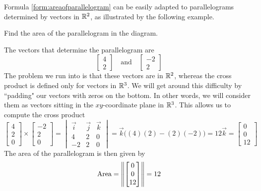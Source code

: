 \documentclass{ximera}
\begin{document}
Formula \ref{form:areaofparallelogram} can be easily adapted to parallelograms determined by vectors in $\mathbb{R}^2$, as illustrated by the following example.

\begin{example}\label{ex:areaofparallelogram}
Find the area of the parallelogram in the diagram.
\begin{center}
\end{center}
\begin{explanation}
The vectors that determine the parallelogram are 
$$\begin{bmatrix}4\\2\end{bmatrix}\quad\text{and}\quad\begin{bmatrix}-2\\2\end{bmatrix}$$
The problem we run into is that these vectors are in $\mathbb{R}^2$, whereas the cross product is defined only for vectors in $\mathbb{R}^3$.  We will get around this difficulty by ``padding" our vectors with zeros on the bottom.  In other words, we will consider them as vectors sitting in the $xy$-coordinate plane in $\mathbb{R}^3$.  This allows us to compute the cross product 
$$\begin{bmatrix}4\\2\\0\end{bmatrix}\times\begin{bmatrix}-2\\2\\0\end{bmatrix}=\begin{vmatrix}\vec{i}&\vec{j}&\vec{k}\\4&2&0\\-2&2&0\end{vmatrix}=\vec{k}\Big((4)(2)-(2)(-2)\Big)=12\vec{k}=\begin{bmatrix}0\\0\\12\end{bmatrix}$$
The area of the parallelogram is then given by
$$\mbox{Area}=\left\lVert\begin{bmatrix}0\\0\\12\end{bmatrix}\right\rVert=12$$
\end{explanation}
\end{example}
\end{document}
